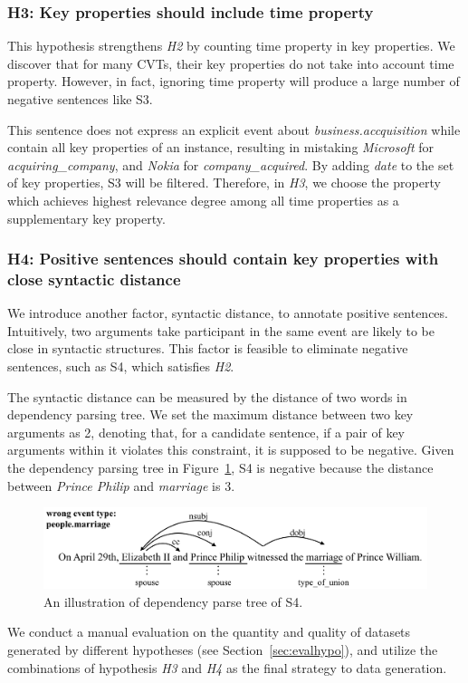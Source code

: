\documentclass{article}
\begin{document}
\subsubsection{H3: Key properties should include time property}
This hypothesis strengthens \emph{H2} by counting time property in key properties. We discover that for many CVTs, their key properties do not take into account time property. However, in fact, ignoring time property will produce a large number of negative sentences like S3. 

This sentence does not express an explicit event about \emph{business.accquisition} while contain all key properties of an instance, resulting in mistaking \emph{Microsoft} for \emph{acquiring\_company}, and \emph{Nokia} for \emph{company\_acquired}. By adding \emph{date} to the set of key properties, S3 will be filtered. Therefore, in \emph{H3}, we choose the property which achieves highest relevance degree among all time properties as a supplementary key property. 

\subsubsection{H4: Positive sentences should contain key properties with close syntactic distance}
We introduce another factor, syntactic distance, to annotate positive sentences. Intuitively, two arguments take participant in the same event are likely to be close in syntactic structures. This factor is feasible to eliminate negative sentences, such as S4, which satisfies \emph{H2}. 

The syntactic distance can be measured by the distance of two words in dependency parsing tree. We set the maximum distance between two key arguments as 2, denoting that, for a candidate sentence, if a pair of key arguments within it violates this constraint, it is supposed to be negative. Given the dependency parsing tree in  Figure~\ref{fig:2}, S4 is negative because the distance between \emph{Prince Philip} and \emph{marriage} is 3.

\begin{figure}
	\includegraphics[width=.48\textwidth]{deppath}
	\caption{An illustration of dependency parse tree of S4. \label{fig:2}}
\end{figure}
We conduct a manual evaluation on the quantity and quality of  datasets generated by different hypotheses (see Section~\ref{sec:evalhypo}), and utilize the combinations of hypothesis \emph{H3} and \emph{H4} as the final strategy to data generation.
\end{document}
